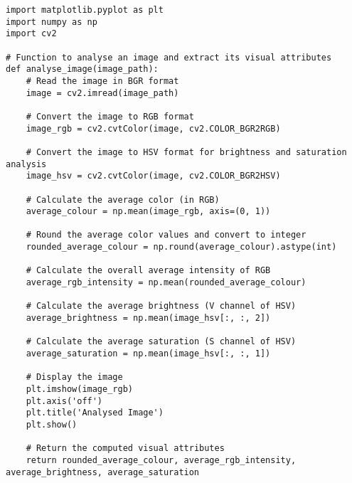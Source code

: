\begin{lstlisting}
import matplotlib.pyplot as plt
import numpy as np
import cv2

# Function to analyse an image and extract its visual attributes
def analyse_image(image_path):
    # Read the image in BGR format
    image = cv2.imread(image_path)
    
    # Convert the image to RGB format
    image_rgb = cv2.cvtColor(image, cv2.COLOR_BGR2RGB)
    
    # Convert the image to HSV format for brightness and saturation analysis
    image_hsv = cv2.cvtColor(image, cv2.COLOR_BGR2HSV)
    
    # Calculate the average color (in RGB)
    average_colour = np.mean(image_rgb, axis=(0, 1))
    
    # Round the average color values and convert to integer
    rounded_average_colour = np.round(average_colour).astype(int)

    # Calculate the overall average intensity of RGB
    average_rgb_intensity = np.mean(rounded_average_colour)

    # Calculate the average brightness (V channel of HSV)
    average_brightness = np.mean(image_hsv[:, :, 2])
    
    # Calculate the average saturation (S channel of HSV)
    average_saturation = np.mean(image_hsv[:, :, 1])
    
    # Display the image
    plt.imshow(image_rgb)
    plt.axis('off')
    plt.title('Analysed Image')
    plt.show()
        
    # Return the computed visual attributes
    return rounded_average_colour, average_rgb_intensity, average_brightness, average_saturation
\end{lstlisting}
